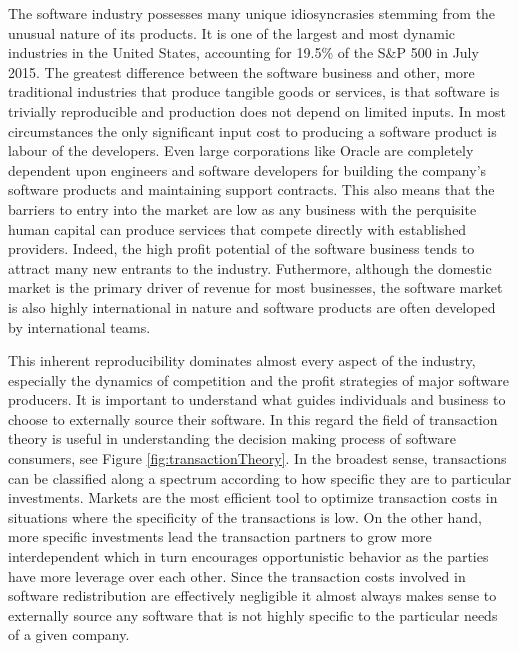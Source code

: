 The software industry possesses many unique idiosyncrasies stemming from the unusual nature of its products.
It is one of the largest and most dynamic industries in the United States, accounting for 19.5\% of the S\&P 500 in July 2015.\autocite[6]{SurveysSoftware2015}
The greatest difference between the software business and other, more traditional industries that produce tangible goods or services, is that software is trivially reproducible and production does not depend on limited inputs.\autocite[3]{buxmann2012software}
In most circumstances the only significant input cost to producing a software product is labour of the developers.
Even large corporations like Oracle are completely dependent upon engineers and software developers for building the company's software products and maintaining support contracts.\autocite[115]{finkle2012larry}
This also means that the barriers to entry into the market are low as any business with the perquisite human capital can produce services that compete directly with established providers.\autocite[115]{finkle2012larry}
Indeed, the high profit potential of the software business tends to attract many new entrants to the industry.\autocite[116]{finkle2012larry}
Futhermore, although the domestic market is the primary driver of revenue for most businesses,\autocite[]{ITSoftwareEconomist} the software market is also highly international in nature and software products are often developed by international teams.\autocite[3]{buxmann2012software}

This inherent reproducibility dominates almost every aspect of the industry, especially the dynamics of competition and the profit strategies of major software producers.
It is important to understand what guides individuals and business to choose to externally source their software.
In this regard the field of transaction theory is useful in understanding the decision making process of software consumers, see Figure \ref{fig:transactionTheory}.
In the broadest sense, transactions can be classified along a spectrum according to how specific they are to particular investments.
Markets are the most efficient tool to optimize transaction costs in situations where the specificity of the transactions is low.
On the other hand, more specific investments lead the transaction partners to grow more interdependent which in turn encourages opportunistic behavior as the parties have more leverage over each other.\autocite[44]{buxmann2012software}
Since the transaction costs involved in software redistribution are effectively negligible it almost always makes sense to externally source any software that is not highly specific to the particular needs of a given company.

